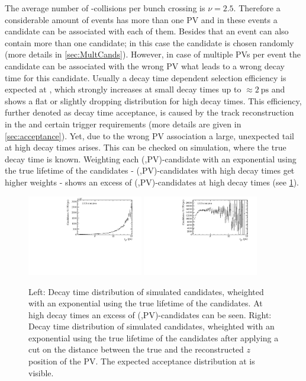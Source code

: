 The average number of \proton\proton-collisions per bunch crossing is $\nu=2.5$.
Therefore a considerable amount of events has more than one \ac{PV} and in these events a \Bz candidate can be associated with each of them.
Besides that an event can also contain more than one \Bz candidate; in this case the \Bz candidate is chosen randomly (more details in \cref{sec:MultCands}).
However, in case of multiple \ac{PV}s per event the \Bz candidate can be associated with the wrong PV what leads to a wrong decay time for this candidate.
Usually a decay time dependent selection efficiency is expected at \lhcb, which strongly increases at small decay times up to $\approx\SI{2}{\pico\second}$ and shows a flat or slightly dropping distribution for high decay times.
This efficiency, further denoted as decay time acceptance, is caused by the track reconstruction in the \velo and certain trigger requirements (more details are given in \cref{sec:acceptance}).
Yet, due to the wrong \ac{PV} association a large, unexpected tail at high decay times arises.
This can be checked on simulation, where the true decay time is known.
Weighting each (\Bz,\ac{PV})-candidate with an exponential using the true lifetime of the \Bz candidates - \ie (\Bz,\ac{PV})-candidates with high decay times get higher weights - shows an excess of (\Bz,\ac{PV})-candidates at high decay times (see \cref{fig:WrongPVMC}).
\begin{figure}[tbp]
    \centering
    \includegraphics[width=0.45\textwidth]{06selection/figs/WrongPVs-weightedBad.pdf}
    \includegraphics[width=0.45\textwidth]{06selection/figs/WrongPVs-weightedGoodMC.pdf}
    \caption{Left: Decay time distribution of simulated \BdToDpi candidates, wheighted with an exponential using the true lifetime of the \Bz candidates.
    At high decay times an excess of (\Bz,\ac{PV})-candidates can be seen.
    Right: Decay time distribution of simulated \BdToDpi candidates, wheighted with an exponential using the true lifetime of the \Bz candidates after applying a cut on the distance between the true and the reconstructed $z$ position of the \ac{PV}.
    The expected acceptance distribution at \lhcb is visible.}
    \label{fig:WrongPVMC}
\end{figure}

